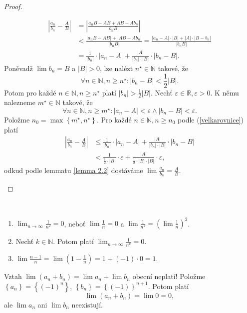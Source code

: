 \begin{proof}
\begin{enumerate}[(a)]
\begin{equation}
    \begin{aligned}
        \left | \frac{a_n}{b_n}-\frac{A}{B} \right | & = \left | \frac{a_nB-AB+AB-Ab_n}{b_nB} \right |\\
        & < \frac{|a_nB-AB|+|AB-Ab_n|}{|b_nB|} = \frac{|a_n-A|\cdot |B|+ |A|\cdot |B-b_n|}{|b_nB|}\\
        &= \frac{1}{|b_n|}\cdot |a_n - A|+ \frac{|A|}{|b_n|\cdot |B|}\cdot |b_n-B|.
    \end{aligned}
    \end{equation}
    Poněvadž $\lim b_n =B$ a $|B|>0$, lze nalézt $n^\star \in \mathbb N $ takové, že
    $$
        \forall n \in \mathbb N , n \geq n^\star : |b_n-B| < \frac{1}{2}|B|.
    $$
    Potom pro každé $n \in \mathbb N , n \geq n^\star$ platí $|b_n| > \frac{1}{2}|B|$.
    Nechť $\varepsilon \in \mathbb R , \varepsilon > 0$. K němu nalezneme $m^\star \in \mathbb N $ takové, že
    $$
        \forall n \in \mathbb N , n\geq m^\star: |a_n - A| < \varepsilon \land |b_n - B| < \varepsilon.
    $$
    Položme $n_0 = \max \left \{ m^\star, n^\star \right \} $. Pro každé $n\in \mathbb N , n \geq n_0$ podle (\ref{velkarovnice})
    platí
    \begin{align*}
    \left | \frac{a_n}{b_n}-\frac{A}{B} \right |& \leq \frac{1}{|b_n|} \cdot |a_n -A| + \frac{|A|}{|b_n| \cdot |B|} \cdot |b_n-B|\\
    & < \frac{1}{\frac{1}{2}\cdot |B|}\cdot \varepsilon + \frac{|A|}{\frac{1}{2}\cdot |B|\cdot |B|}\cdot \varepsilon,
    \end{align*}
    odkud podle lemmatu \ref{lemma 2.2} dostáváme $\lim \frac{a_n}{b_n}=\frac{A}{B}$.\qedhere
\end{enumerate}
\end{proof}

\begin{priklad}
	\,
	\begin{enumerate}[(1)]
		\item $\lim_{n \to \infty} \frac{1}{n^2} = 0$, neboť $\lim \frac{1}{n} = 0$ a $\lim \frac{1}{n^2} = \left( \lim \frac{1}{n} \right )^2 $.
		\item Nechť $k \in \mathbb N .$ Potom platí $\lim_{n \to \infty} \frac{1}{n^k}=0$.
		\item $\lim \frac{n-1}{n}=\lim \left( 1-\frac{1}{n} \right ) =1+(-1)\cdot 0 = 1$.
\end{enumerate}
\end{priklad}

\begin{poznamka}[Varování!]
	Vztah $\lim (a_n + b_n) = \lim a_n + \lim b_n$ obecní neplatí! Položme $\left \{ a_n \right \} = \left \{ (-1)^n \right \}  $,
	$\left \{ b_n \right \} = \left \{ (-1) \right \}^{n+1}  $. Potom platí
	$$
	    \lim(a_n+b_n) = \lim 0 = 0,
	$$
	ale $\lim a_n$ ani $\lim b_n$ neexistují.
\end{poznamka}

